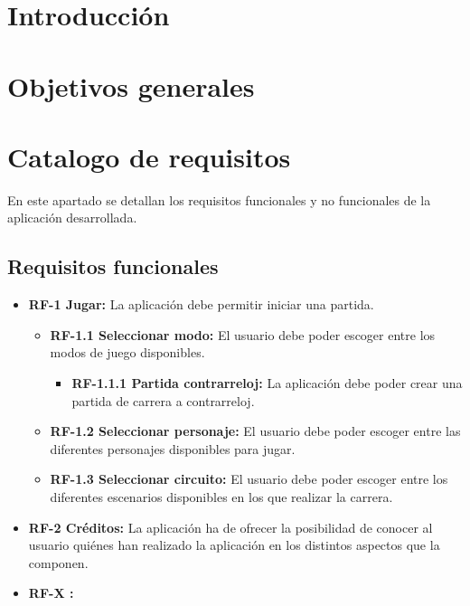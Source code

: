 
\section{Introducción}

\section{Objetivos generales}

\section{Catalogo de requisitos}
En este apartado se detallan los requisitos funcionales y no funcionales de la aplicación desarrollada.

\subsection{Requisitos funcionales}
\begin{itemize}
\tightlist
\item 
	\textbf{RF-1 Jugar:} La aplicación debe permitir iniciar una partida.
	
	\begin{itemize}
    \tightlist
    \item
      	\textbf{RF-1.1 Seleccionar modo:} El usuario debe poder escoger entre los modos de juego disponibles.
      	
      	\begin{itemize}
		\tightlist
		\item
			\textbf{RF-1.1.1 Partida contrarreloj:} La aplicación debe poder crear una partida de carrera a contrarreloj.
    	\end{itemize}
    	\item
    		\textbf{RF-1.2 Seleccionar personaje:} El usuario debe poder escoger entre las diferentes personajes disponibles para jugar.
		\item    	
    		\textbf{RF-1.3 Seleccionar circuito:} El usuario debe poder escoger entre los diferentes escenarios disponibles en los que realizar la carrera.
    	
    \end{itemize}
    
	\item \textbf{RF-2 Créditos:} La aplicación ha de ofrecer la posibilidad de conocer al usuario quiénes han realizado la aplicación en los distintos aspectos que la componen.
	\item \textbf{RF-X :}
\end{itemize}
